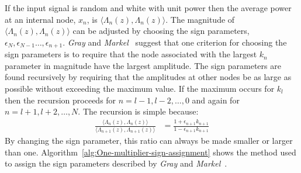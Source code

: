 \documentclass[a4paper,twoside,10pt,english]{article}
\begin{document}
If the input signal is random and white with unit power then the average power
at an internal node, $x_{n}$, is
$\langle\Lambda_{n}\left(z\right),\Lambda_{n}\left(z\right)\rangle$. The
magnitude of $\langle\Lambda_{n}\left(z\right),\Lambda_{n}\left(z\right)\rangle$
can be adjusted by choosing the sign parameters,
$\epsilon_{N},\epsilon_{N-1}\hdots,\epsilon_{n+1}$.
\emph{Gray} and
\emph{Markel}~\cite[p. 496]{GrayMarkel_DigitalLatticeAndLadderFilterSynthesis}
suggest that one criterion for choosing the sign parameters is to require that
the node associated with the largest $k_{n}$ parameter in magnitude have the
largest amplitude. The sign parameters are found recursively by requiring that
the amplitudes at other nodes be as large as possible without exceeding the
maximum value. If the maximum occurs for $k_{l}$ then the recursion proceeds
for $n=l-1,l-2,\ldots,0$ and again for $n=l+1,l+2,\ldots,N$. The
recursion is simple because:
\begin{align*}
  \frac{\langle \Lambda_{n}\left(z\right),\Lambda_{n}\left(z\right)\rangle}
       {\langle \Lambda_{n+1}\left(z\right),\Lambda_{n+1}\left(z\right)\rangle}
  &= \frac{1+\epsilon_{n+1}k_{n+1}}{1-\epsilon_{n+1}k_{n+1}}
\end{align*}
By changing the sign parameter, this ratio can always be made smaller or larger 
than one. Algorithm~\ref{alg:One-multiplier-sign-assignment} shows the method
used to assign the sign parameters described by \emph{Gray} and
\emph{Markel}~\cite[p. 496]{GrayMarkel_DigitalLatticeAndLadderFilterSynthesis}.
\end{document}
